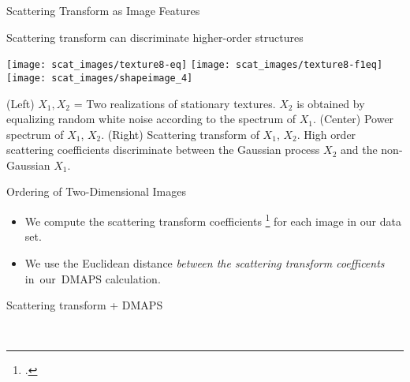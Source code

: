 \begin{frame}{Scattering Transform as Image Features}
\begin{minipage}{0.4\textwidth}
\begin{block}{{\small Scattering transform can discriminate higher-order structures \par}}
\texttt{[image: scat\_images/texture8-eq]}
\texttt{[image: scat\_images/texture8-f1eq]}
\texttt{[image: scat\_images/shapeimage\_4]}\\
{\tiny (Left) $X_1, X_2$ = Two realizations of stationary textures. $X_2$ is obtained by equalizing random white noise according to the spectrum of $X_1$. (Center) Power spectrum of $X_1$, $X_2$. (Right) Scattering transform of $X_1$, $X_2$. High order scattering coefficients discriminate between the Gaussian process $X_2$ and the non-Gaussian $X_1$. \par}
\end{block}

\end{minipage}

\end{frame}

\begin{frame}{Ordering of Two-Dimensional Images}

	{\small 
	\begin{itemize}
		\item We compute the scattering transform coefficients \footcite{scatnet} for each image in our data set.
		\item We use the Euclidean distance {\em between the scattering transform coefficents} in~our~DMAPS calculation.
	\end{itemize}
    \par}
	
	\drawunordered
    
    	\drawdownarrow 
    	
    \begin{minipage}{0.5\textwidth}
    \centering
	{\scriptsize Scattering transform + DMAPS \par}
    \end{minipage}\\
    \drawdownarrow
    
	\draworderedscat 
    
\end{frame}

    
    

    